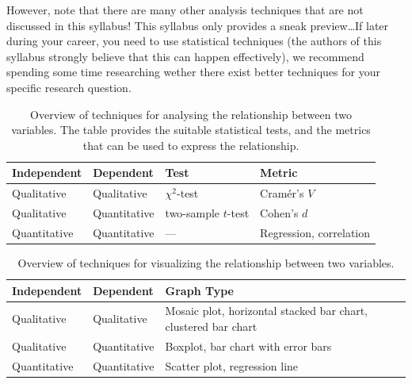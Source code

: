 However, note that there are many other analysis techniques that are not discussed in this syllabus! This syllabus only provides a sneak preview\ldots If later during your career, you need to use statistical techniques (the authors of this syllabus strongly believe that this can happen effectively), we recommend spending some time researching wether there exist better techniques for your specific research question.

\begin{table}
    \begin{tabular}{llll}
        \toprule
        \textbf{Independent}    & \textbf{Dependent}    & \textbf{Test}                 & \textbf{Metric}         \\
        \midrule
        Qualitative             & Qualitative           & $\chi^2$-test                 & Cramér's $V$            \\
        Qualitative             & Quantitative          & two-sample $t$-test           & Cohen's $d$             \\
        Quantitative            & Quantitative          & ---                           & Regression, correlation \\
        \bottomrule
    \end{tabular}
    \caption{Overview of techniques for analysing the relationship between two variables. The table provides the suitable statistical tests, and the metrics that can be used to express the relationship.}
    \label{tab:bivariate_analysis}
\end{table}

\begin{table}
    \begin{tabular}{lll}
        \toprule
        \textbf{Independent}    & \textbf{Dependent}    & \textbf{Graph Type}                                  \\
        \midrule
        Qualitative             & Qualitative           & Mosaic plot, horizontal stacked bar chart, clustered bar chart \\
        Qualitative             & Quantitative          & Boxplot, bar chart with error bars                  \\
        Quantitative            & Quantitative          & Scatter plot, regression line                    \\
        \bottomrule
    \end{tabular}
    \caption{Overview of techniques for visualizing the relationship between two variables.}
    \label{tab:bivariate_visualization}
\end{table}

